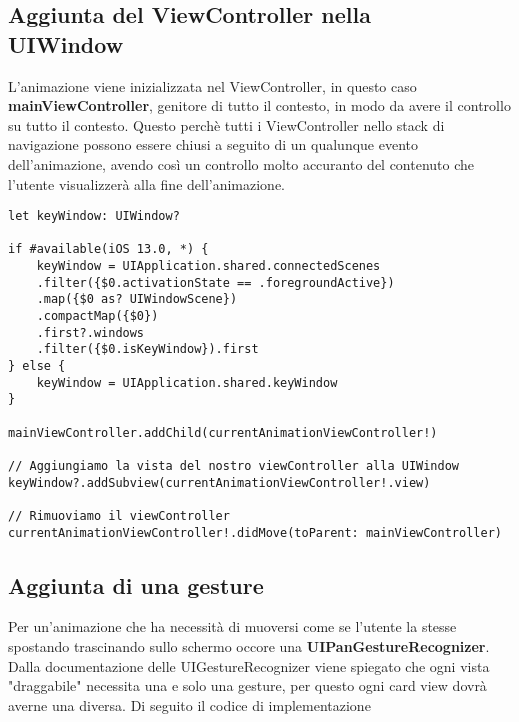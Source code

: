 \subsection{Aggiunta del ViewController nella\\UIWindow}

L'animazione viene inizializzata nel ViewController, in questo caso \textbf{mainViewController},
genitore di tutto il contesto, in modo da avere il controllo su tutto 
il contesto. Questo perchè tutti i ViewController nello stack di navigazione possono
essere chiusi a seguito di un qualunque evento dell'animazione, avendo così un controllo molto accuranto
del contenuto che l'utente visualizzerà alla fine dell'animazione.

\begin{verbatim}
let keyWindow: UIWindow?

if #available(iOS 13.0, *) {
    keyWindow = UIApplication.shared.connectedScenes
    .filter({$0.activationState == .foregroundActive})
    .map({$0 as? UIWindowScene})
    .compactMap({$0})
    .first?.windows
    .filter({$0.isKeyWindow}).first
} else {
    keyWindow = UIApplication.shared.keyWindow
}

mainViewController.addChild(currentAnimationViewController!)

// Aggiungiamo la vista del nostro viewController alla UIWindow
keyWindow?.addSubview(currentAnimationViewController!.view)

// Rimuoviamo il viewController
currentAnimationViewController!.didMove(toParent: mainViewController)
\end{verbatim}

\subsection{Aggiunta di una gesture}\label{gestureimplemention}

Per un'animazione che ha necessità di muoversi come se l'utente la stesse spostando trascinando sullo schermo occore una \textbf{UIPanGestureRecognizer}.
Dalla documentazione delle UIGestureRecognizer viene spiegato che ogni vista "draggabile" necessita una  e solo una gesture,
per questo ogni card view dovrà averne una diversa. Di seguito il codice di implementazione

